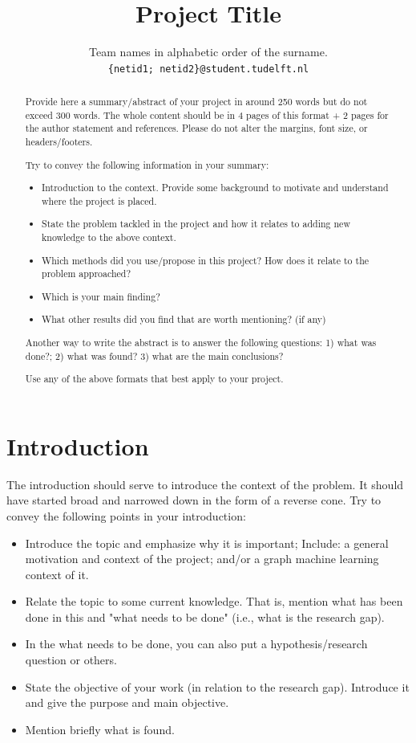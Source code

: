 \documentclass{article}
\title{Project Title}
\author{%
  Team names in alphabetic order of the surname.\\
  \texttt{\{netid1; netid2\}@student.tudelft.nl} \\
}
\begin{document}
\maketitle


\begin{abstract}
Provide here a summary/abstract of your project in around 250 words but do not exceed 300 words. The whole content should be in 4 pages of this format + 2 pages for the author statement and references. Please do not alter the margins, font size, or headers/footers.

Try to convey the following information in your summary:
\begin{itemize}
    \item Introduction to the context. Provide some background to motivate and understand where the project is placed.
    \item State the problem tackled in the project and how it relates to adding new knowledge to the above context.
    \item Which methods did you use/propose in this project? How does it relate to the problem approached?
    \item Which is your main finding?
    \item What other results did you find that are worth mentioning? (if any)
\end{itemize}

Another way to write the abstract is to answer the following questions: 1) what was done?; 2) what was found? 3) what are the main conclusions?

Use any of the above formats that best apply to your project.

\end{abstract}


\section{Introduction}

The introduction should serve to introduce the context of the problem. It should have started broad and narrowed down in the form of a reverse cone. Try to convey the following points in your introduction:

\begin{itemize}
    \item Introduce the topic and emphasize why it is important; Include: a general motivation and context of the project; and/or a graph machine learning context of it.
    \item Relate the topic to some current knowledge. That is, mention what has been done in this and "what needs to be done" (i.e., what is the research gap).
    \item In the what needs to be done, you can also put a hypothesis/research question or others.
    \item State the objective of your work (in relation to the research gap). Introduce it and give the purpose and main objective.
    \item Mention briefly what is found.
\end{itemize}
\end{document}
